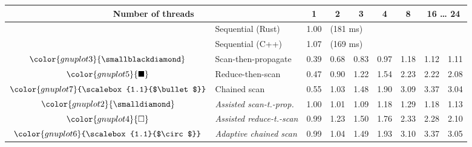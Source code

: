 \begin{tabular}{clrrrrrrr}
\toprule
\multicolumn{2}{c}{\textbf{Number of threads}} & \multicolumn{1}{c}{\textbf{ 1 }} & \multicolumn{1}{c}{\textbf{ 2 }} & \multicolumn{1}{c}{\textbf{ 3 }} & \multicolumn{1}{c}{\textbf{ 4 }} & \multicolumn{1}{c}{\textbf{ 8 }} & \multicolumn{2}{c}{\textbf{ 16 } \dots \textbf{ 24 }} \\
\midrule
& Sequential (Rust) & \multicolumn{1}{r}{ 1.00 } & \multicolumn{ 6 }{l}{(181 ms)} \\
& Sequential (C++) & \multicolumn{1}{r}{ 1.07 } & \multicolumn{ 6 }{l}{(169 ms)} \\
\rowcolor{gnuplot3!10}$\color{gnuplot3}{\smallblackdiamond}$ & Scan-then-propagate & \cellcolor{gnuplot3!10} 0.39 & \cellcolor{gnuplot3!10} 0.68 & \cellcolor{gnuplot3!10} 0.83 & \cellcolor{gnuplot3!10} 0.97 & \cellcolor{gnuplot3!10} 1.18 & \cellcolor{gnuplot3!10} 1.12 & \cellcolor{gnuplot3!10} 1.11 \\
\rowcolor{gnuplot5!10}$\color{gnuplot5}{\blacksquare}$ & Reduce-then-scan & \cellcolor{gnuplot5!10} 0.47 & \cellcolor{gnuplot5!10} 0.90 & \cellcolor{gnuplot5!10} 1.22 & \cellcolor{gnuplot5!10} 1.54 & \cellcolor{gnuplot5!10} 2.23 & \cellcolor{gnuplot5!10} 2.22 & \cellcolor{gnuplot5!10} 2.08 \\
\rowcolor{gnuplot7!10}$\color{gnuplot7}{\scalebox{1.1}{$\bullet$}}$ & Chained scan & \cellcolor{gnuplot7!10} 0.55 & \cellcolor{gnuplot7!10} 1.03 & \cellcolor{gnuplot7!10} 1.48 & \cellcolor{gnuplot7!10} 1.90 & \cellcolor{gnuplot7!10} 3.09 & \cellcolor{gnuplot7!10} 3.37 & \cellcolor{gnuplot7!10} 3.04 \\
\rowcolor{gnuplot2!30}$\color{gnuplot2}{\smalldiamond}$ & \textit{Assisted scan-t.-prop.} & \cellcolor{gnuplot2!30} 1.00 & \cellcolor{gnuplot2!30} 1.01 & \cellcolor{gnuplot2!30} 1.09 & \cellcolor{gnuplot2!30} 1.18 & \cellcolor{gnuplot2!30} 1.29 & \cellcolor{gnuplot2!30} 1.18 & \cellcolor{gnuplot2!30} 1.13 \\
\rowcolor{gnuplot4!30}$\color{gnuplot4}{\square}$ & \textit{Assisted reduce-t.-scan} & \cellcolor{gnuplot4!30} 0.99 & \cellcolor{gnuplot4!30} 1.23 & \cellcolor{gnuplot4!30} 1.50 & \cellcolor{gnuplot4!30} 1.76 & \cellcolor{gnuplot4!30} 2.33 & \cellcolor{gnuplot4!30} 2.28 & \cellcolor{gnuplot4!30} 2.10 \\
\rowcolor{gnuplot6!30}$\color{gnuplot6}{\scalebox{1.1}{$\circ$}}$ & \textit{Adaptive chained scan} & \cellcolor{gnuplot6!30} 0.99 & \cellcolor{gnuplot6!30} 1.04 & \cellcolor{gnuplot6!30} 1.49 & \cellcolor{gnuplot6!30} 1.93 & \cellcolor{gnuplot6!30} 3.10 & \cellcolor{gnuplot6!30} 3.37 & \cellcolor{gnuplot6!30} 3.05 \\

\end{tabular}
